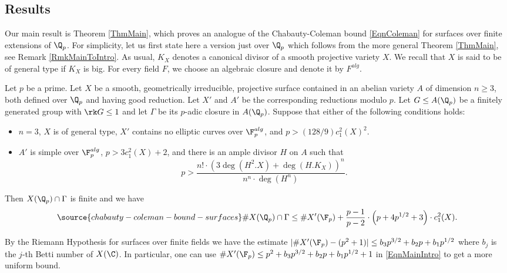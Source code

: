 
\subsection{Results}\label{SecIntroResults} Our main result is Theorem \ref{ThmMain}, which  proves an analogue of the Chabauty-Coleman bound  \eqref{EqnColeman} for surfaces over finite extensions of $\Q_p$. For simplicity, let us first state here a version just over $\Q_p$ which follows from the more general Theorem \ref{ThmMain}, see Remark \ref{RmkMainToIntro}. As usual, $K_X$ denotes a canonical divisor of a smooth projective variety $X$. We recall that $X$ is said to be  of general type if $K_X$ is big.  For every field $F$, we choose an algebraic closure and denote it by $F^{alg}$.
\begin{theorem}
\notready\label{ThmMainIntro} Let $p$ be a prime. Let $X$ be a smooth, geometrically irreducible, projective surface contained in an abelian variety $A$ of dimension $n\ge 3$, both defined over $\Q_p$ and having good reduction. Let $X'$ and $A'$ be the corresponding reductions modulo $p$. Let $G\le A(\Q_p)$ be a finitely generated group with $\rk G\le 1$ and let $\Gamma$ be its $p$-adic closure in $A(\Q_p)$.  Suppose that either of the following conditions holds:
\begin{itemize}
\item[(i)] $n=3$, $X$ is of general type, $X'$ contains no elliptic curves over $\F_p^{alg}$, and $p>(128/9)c_1^2(X)^2$.
\item[(ii)] $A'$ is simple over $\F_p^{alg}$, $p>3c_1^2(X)+2$, and there is an ample divisor $H$ on $A$ such that
$$
p> \frac{n!\cdot (3\deg(H^{2}.X) + \deg(H.K_X))^n}{n^n\cdot \deg(H^n)}.
$$
\end{itemize}
Then $X(\Q_p)\cap \Gamma$ is finite and we have
\begin{equation}\label{EqnMainIntro}
\source{chabauty-coleman-bound-surfaces}
 \# X(\Q_p)\cap \Gamma\le \# X'(\F_p) + \frac{p-1}{p-2}\cdot \left(p+4p^{1/2} + 3\right)\cdot c_1^2(X).
 \end{equation}
\end{theorem}
\begin{remark}
\notready\label{RmkRHbd} By the Riemann Hypothesis for surfaces over finite fields \cite{Deligne} we have the estimate $|\# X'(\F_p) - (p^2+1)|\le b_3p^{3/2} + b_2 p+b_1p^{1/2}$ where $b_j$ is the $j$-th Betti number of $X(\C)$. In particular, one can use $\# X'(\F_p)\le p^2+b_3p^{3/2} + b_2 p+b_1p^{1/2}+1$  in \eqref{EqnMainIntro} to get a more uniform bound.
\end{remark}
